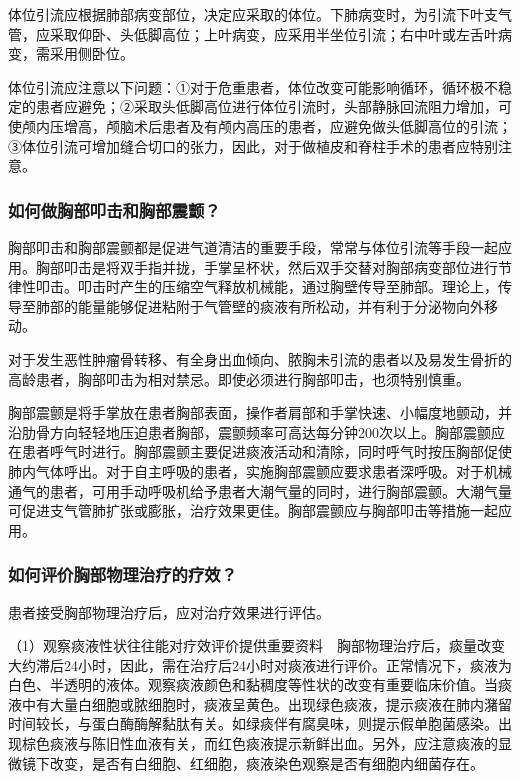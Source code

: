 体位引流应根据肺部病变部位，决定应采取的体位。下肺病变时，为引流下叶支气管，应采取仰卧、头低脚高位；上叶病变，应采用半坐位引流；右中叶或左舌叶病变，需采用侧卧位。

体位引流应注意以下问题：①对于危重患者，体位改变可能影响循环，循环极不稳定的患者应避免；②采取头低脚高位进行体位引流时，头部静脉回流阻力增加，可使颅内压增高，颅脑术后患者及有颅内高压的患者，应避免做头低脚高位的引流；③体位引流可增加缝合切口的张力，因此，对于做植皮和脊柱手术的患者应特别注意。

\subsubsection{如何做胸部叩击和胸部震颤？}

胸部叩击和胸部震颤都是促进气道清洁的重要手段，常常与体位引流等手段一起应用。胸部叩击是将双手指并拢，手掌呈杯状，然后双手交替对胸部病变部位进行节律性叩击。叩击时产生的压缩空气释放机械能，通过胸壁传导至肺部。理论上，传导至肺部的能量能够促进粘附于气管壁的痰液有所松动，并有利于分泌物向外移动。

对于发生恶性肿瘤骨转移、有全身出血倾向、脓胸未引流的患者以及易发生骨折的高龄患者，胸部叩击为相对禁忌。即使必须进行胸部叩击，也须特别慎重。

胸部震颤是将手掌放在患者胸部表面，操作者肩部和手掌快速、小幅度地颤动，并沿肋骨方向轻轻地压迫患者胸部，震颤频率可高达每分钟200次以上。胸部震颤应在患者呼气时进行。胸部震颤主要促进痰液活动和清除，同时呼气时按压胸部促使肺内气体呼出。对于自主呼吸的患者，实施胸部震颤应要求患者深呼吸。对于机械通气的患者，可用手动呼吸机给予患者大潮气量的同时，进行胸部震颤。大潮气量可促进支气管肺扩张或膨胀，治疗效果更佳。胸部震颤应与胸部叩击等措施一起应用。

\subsubsection{如何评价胸部物理治疗的疗效？}

患者接受胸部物理治疗后，应对治疗效果进行评估。

（1）观察痰液性状往往能对疗效评价提供重要资料　胸部物理治疗后，痰量改变大约滞后24小时，因此，需在治疗后24小时对痰液进行评价。正常情况下，痰液为白色、半透明的液体。观察痰液颜色和黏稠度等性状的改变有重要临床价值。当痰液中有大量白细胞或脓细胞时，痰液呈黄色。出现绿色痰液，提示痰液在肺内潴留时间较长，与蛋白酶酶解黏肽有关。如绿痰伴有腐臭味，则提示假单胞菌感染。出现棕色痰液与陈旧性血液有关，而红色痰液提示新鲜出血。另外，应注意痰液的显微镜下改变，是否有白细胞、红细胞，痰液染色观察是否有细胞内细菌存在。

